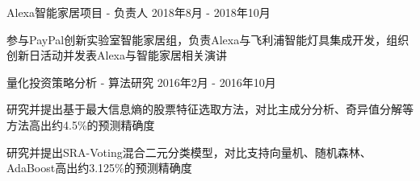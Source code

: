 \documentclass[11pt, a4paper, UTF8]{awesome-cv}
\begin{document}
%
\begin{cventries}
  \cventry
    {Alexa智能家居项目 - 负责人} %
    {} %
    {} %
    {2018年8月 - 2018年10月} %
    {
      \begin{cvitems} %
        \item {参与PayPal创新实验室智能家居组，负责Alexa与飞利浦智能灯具集成开发，组织创新日活动并发表Alexa与智能家居相关演讲}
      \end{cvitems}
    }

  \cventry
    {量化投资策略分析 - 算法研究} %
    {} %
    {} %
    {2016年2月 - 2016年10月} %
    {
      \begin{cvitems} %
        \item {研究并提出基于最大信息熵的股票特征选取方法，对比主成分分析、奇异值分解等方法高出约4.5\%的预测精确度}
        \item {研究并提出SRA-Voting混合二元分类模型，对比支持向量机、随机森林、AdaBoost高出约3.125\%的预测精确度}
      \end{cvitems}
    }
    
    
\end{cventries}
\end{document}
